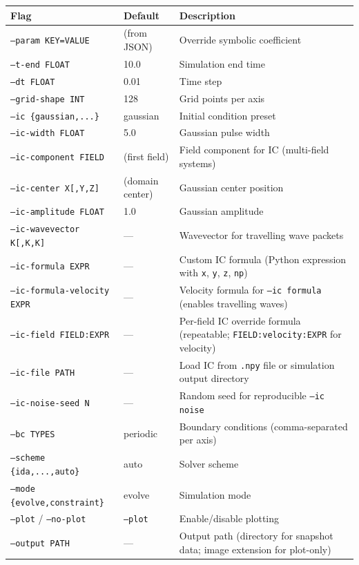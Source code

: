 \begin{table}[htbp]
\centering
\begin{tabular}{@{}llp{4.5cm}@{}}
\toprule
Flag & Default & Description \\
\midrule
\texttt{--param KEY=VALUE}          & (from JSON)       & Override symbolic coefficient \\
\texttt{--t-end FLOAT}             & 10.0              & Simulation end time \\
\texttt{--dt FLOAT}                & 0.01              & Time step \\
\texttt{--grid-shape INT}          & 128               & Grid points per axis \\
\texttt{--ic \{gaussian,...\}}      & gaussian          & Initial condition preset \\
\texttt{--ic-width FLOAT}          & 5.0               & Gaussian pulse width \\
\texttt{--ic-component FIELD}      & (first field)     & Field component for IC (multi-field systems) \\
\texttt{--ic-center X[,Y,Z]}      & (domain center)   & Gaussian center position \\
\texttt{--ic-amplitude FLOAT}      & 1.0               & Gaussian amplitude \\
\texttt{--ic-wavevector K[,K,K]}   & ---               & Wavevector for travelling wave packets \\
\texttt{--ic-formula EXPR}         & ---               & Custom IC formula (Python expression with \texttt{x}, \texttt{y}, \texttt{z}, \texttt{np}) \\
\texttt{--ic-formula-velocity EXPR}& ---               & Velocity formula for \texttt{--ic formula} (enables travelling waves) \\
\texttt{--ic-field FIELD:EXPR}     & ---               & Per-field IC override formula (repeatable; \texttt{FIELD:velocity:EXPR} for velocity) \\
\texttt{--ic-file PATH}            & ---               & Load IC from \texttt{.npy} file or simulation output directory \\
\texttt{--ic-noise-seed N}         & ---               & Random seed for reproducible \texttt{--ic noise} \\
\texttt{--bc TYPES}                & periodic          & Boundary conditions (comma-separated per axis) \\
\texttt{--scheme \{ida,...,auto\}}  & auto              & Solver scheme \\
\texttt{--mode \{evolve,constraint\}}& evolve           & Simulation mode \\
\texttt{--plot} / \texttt{--no-plot}& \texttt{--plot}   & Enable/disable plotting \\
\texttt{--output PATH}             & ---               & Output path (directory for snapshot data; image extension for plot-only) \\
\bottomrule
\end{tabular}
\end{table}

